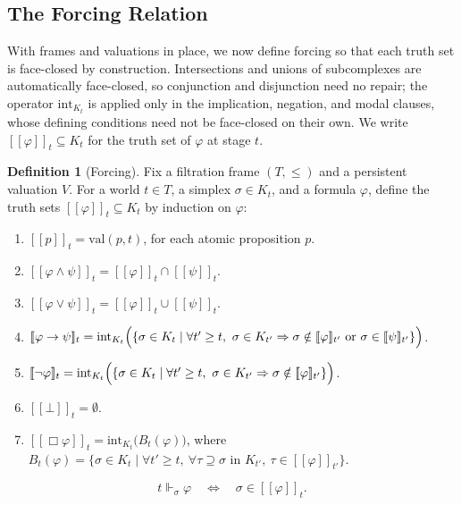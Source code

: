 \documentclass[final,12pt]{elsarticle}
\newcommand{\llbracket}{[\![}
\newcommand{\rrbracket}{]\!]}
\theoremstyle{plain}
\theoremstyle{definition}
\newtheorem{defi}[thm]{Definition}
\begin{document}
\subsection{The Forcing Relation}
\label{subsec:forcing}
With frames and valuations in place, we now define forcing so that each truth set is face-closed by construction. Intersections and unions of subcomplexes are automatically face-closed, so conjunction and disjunction need no repair; the operator \(\mathrm{int}_{K_t}\) is applied only in the implication, negation, and modal clauses, whose defining conditions need not be face-closed on their own. We write \(\llbracket\varphi\rrbracket_t \subseteq K_t\) for the truth set of \(\varphi\) at stage \(t\).

\begin{defi}[Forcing]
\label{def:forcing}
Fix a filtration frame \((T, \leq)\) and a persistent valuation \(V\). For a world \(t \in T\), a simplex \(\sigma \in K_t\), and a formula \(\varphi\), define the truth sets \(\llbracket\varphi\rrbracket_t \subseteq K_t\) by induction on \(\varphi\):
\begin{enumerate}
    \item \(\llbracket p \rrbracket_t = \mathrm{val}(p,t)\), for each atomic proposition \(p\).
    \item \(\llbracket \varphi \land \psi \rrbracket_t = \llbracket \varphi \rrbracket_t \cap \llbracket \psi \rrbracket_t\).
    \item \(\llbracket \varphi \lor \psi \rrbracket_t = \llbracket \varphi \rrbracket_t \cup \llbracket \psi \rrbracket_t\).
    \item \(\llbracket \varphi \to \psi \rrbracket_t
    = \mathrm{int}_{K_t}\Bigl(\{\sigma \in K_t \mid \forall t' \geq t,\ \sigma \in K_{t'} \Rightarrow
    \sigma \notin \llbracket \varphi \rrbracket_{t'} \text{ or } \sigma \in \llbracket \psi \rrbracket_{t'}\}\Bigr)\).
    \item \(\llbracket \neg \varphi \rrbracket_t
    = \mathrm{int}_{K_t}\Bigl(\{\sigma \in K_t \mid \forall t' \geq t,\ \sigma \in K_{t'} \Rightarrow \sigma \notin \llbracket \varphi \rrbracket_{t'}\}\Bigr)\).
    \item \(\llbracket \bot \rrbracket_t = \emptyset\).
    \item \(\llbracket \Box \varphi \rrbracket_t = \mathrm{int}_{K_t}\bigl(B_t(\varphi)\bigr)\),
      where \(B_t(\varphi) = \{\sigma \in K_t \mid \forall t' \geq t,\ \forall \tau \supseteq \sigma
      \text{ in } K_{t'},\ \tau \in \llbracket \varphi \rrbracket_{t'}\}\).
\end{enumerate}
\[
t \Vdash_\sigma \varphi \quad\Longleftrightarrow\quad \sigma \in \llbracket \varphi \rrbracket_t .
\]
\end{defi}
\end{document}
